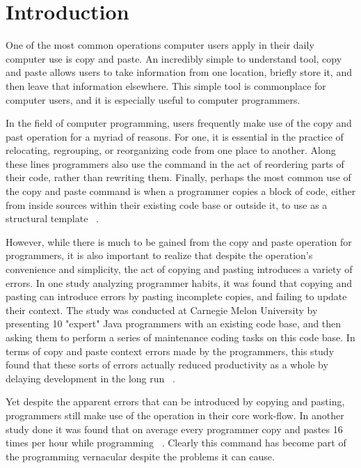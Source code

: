 \documentclass{acm_proc_article-sp}
\begin{document}

\section{Introduction}\label{sec:intro}

One of the most common operations computer users apply in their daily computer use is copy and paste. An incredibly simple to understand tool, copy and paste allows users to take information from one location, briefly store it, and then leave that information elsewhere. This simple tool is commonplace for computer users, and it is especially useful to computer programmers.

In the field of computer programming, users frequently make use of the copy and past operation for a myriad of reasons. For one, it is essential in the practice of relocating, regrouping, or reorganizing code from one place to another. Along these lines programmers also use the command in the act of reordering parts of their code, rather than rewriting them. Finally, perhaps the most common use of the copy and paste command is when a programmer copies a block of code, either from inside sources within their existing code base or outside it, to use as a structural template ~\cite{ooplCP}.

However, while there is much to be gained from the copy and paste operation for programmers, it is also important to realize that despite the operation's convenience and simplicity, the act of copying and pasting introduces a variety of errors. In one study analyzing programmer habits, it was found that copying and pasting can introduce errors by pasting incomplete copies, and failing to update their context. The study was conducted at Carnegie Melon University by presenting 10 "expert" Java programmers with an existing code base, and then asking them to perform a series of maintenance coding tasks on this code base. In terms of copy and paste context errors made by the programmers, this study found that these sorts of errors actually reduced productivity as a whole by delaying development in the long run ~\cite{maintenenceStudy}.

Yet despite the apparent errors that can be introduced by copying and pasting, programmers still make use of the operation in their core work-flow. In another study done it was found that on average every programmer copy and pastes 16 times per hour while programming ~\cite{ooplCP}. Clearly this command has become part of the programming vernacular despite the problems it can cause.
\end{document}

